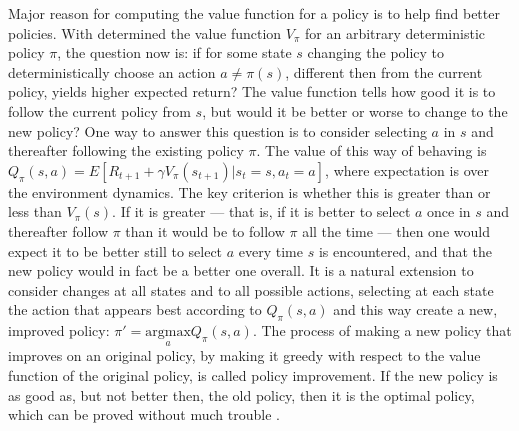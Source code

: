 Major reason for computing the value function for a policy is to help find better policies. With determined the value function $V_\pi$ for an arbitrary deterministic policy $\pi$, the question now is: if for some state $s$ changing the policy to deterministically choose an action $a \neq \pi(s)$, different then from the current policy, yields higher expected return? The value function tells how good it is to follow the current policy from $s$, but would it be better or worse to change to the new policy? One way to answer this question is to consider selecting $a$ in $s$ and thereafter following the existing policy $\pi$. The value of this way of behaving is $Q_\pi(s, a) = E[R_{t+1} + \gamma V_\pi(s_{t+1}) | s_t = s, a_t = a]$, where expectation is over the environment dynamics. The key criterion is whether this is greater than or less than $V_\pi(s)$. If it is greater — that is, if it is better to select $a$ once in $s$ and thereafter follow $\pi$ than it would be to follow $\pi$ all the time — then one would expect it to be better still to select $a$ every time $s$ is encountered, and that the new policy would in fact be a better one overall. It is a natural extension to consider changes at all states and to all possible actions, selecting at each state the action that appears best according to $Q_\pi(s, a)$ and this way create a new, improved policy: $\pi' = \underset{a}{\mathrm{argmax}}Q_\pi(s, a)$. The process of making a new policy that improves on an original policy, by making it greedy with respect to the value function of the original policy, is called policy improvement. If the new policy is as good as, but not better then, the old policy, then it is the optimal policy, which can be proved without much trouble \cite{Book.RLAI}.

